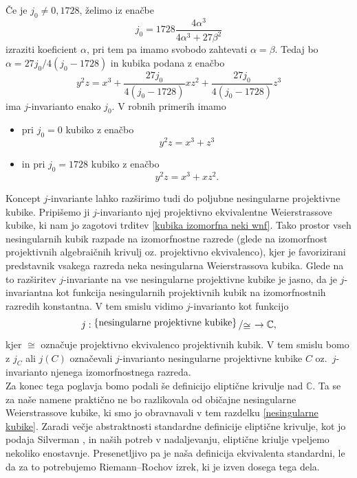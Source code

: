 \documentclass[mat1]{fmfdelo}
\numberwithin{equation}{section}
\newcommand{\C}{\mathbb C}
\newcommand{\bigslant}[2]{{\raisebox{.2em}{$#1$}\left/\raisebox{-.2em}{$#2$}\right.}}
\theoremstyle{definition}
\begin{document}
Če je $j_0 \neq 0, 1728$, želimo iz enačbe
\[
    j_0 = 1728\frac{4\alpha^3}{4\alpha^3 + 27\beta^2}  
\]
izraziti koeficient $\alpha$, pri tem pa imamo svobodo zahtevati $\alpha = \beta$. Tedaj bo $\alpha = 27j_0/4(j_0 - 1728)$ in kubika podana z enačbo 
\[
  y^2z = x^3 + \frac{27j_0}{4(j_0 - 1728)}xz^2 + \frac{27j_0}{4(j_0 - 1728)}z^3
\] 
ima $j$-invarianto enako $j_0$. V robnih primerih imamo

\begin{itemize}
    \item pri $j_0 = 0$ kubiko z enačbo 
    \[
        y^2z = x^3 + z^3
    \]
    \item in pri $j_0 = 1728$ kubiko z enačbo
    \[
        y^2z = x^3 + xz^2.
    \]
\end{itemize}

Koncept $j$-invariante lahko razširimo tudi do poljubne nesingularne projektivne kubike. Pripišemo ji $j$-invarianto njej projektivno ekvivalentne Weierstrassove kubike, ki nam jo zagotovi trditev \ref{kubika izomorfna neki wnf}. Tako prostor vseh nesingularnih kubik razpade na izomorfnostne razrede (glede na izomorfnost projektivnih algebraičnih krivulj oz. projektivno ekvivalenco), kjer je favorizirani predstavnik vsakega razreda neka nesingularna Weierstrassova kubika. Glede na to razširitev $j$-invariante na vse nesingularne projektivne kubike je jasno, da je $j$-invariantna kot funkcija nesingularnih projektivnih kubik na izomorfnostnih razredih konstantna. V tem smislu vidimo $j$-invarianto kot funkcijo
\[
    j: \bigslant{\{\text{nesingularne projektivne kubike}\}}{\cong} \to \C,
\]
kjer $\cong$ označuje projektivno ekvivalenco projektivnih kubik. V tem smislu bomo z $j_C$ ali $j(C)$ označevali $j$-invarianto nesingularne projektivne kubike $C$ oz.\ $j$-invarianto njenega izomorfnostnega razreda.
\\

Za konec tega poglavja bomo podali še definicijo eliptične krivulje nad $\C$. Ta se za naše namene praktično ne bo razlikovala od običajne nesingularne Weierstrassove kubike, ki smo jo obravnavali v tem razdelku \ref{nesingularne kubike}. Zaradi večje abstraktnosti standardne definicije eliptične krivulje, kot jo podaja Silverman \cite[III. \S 3]{Silverman}, in naših potreb v nadaljevanju, eliptične kriulje vpeljemo nekoliko enostavnje. Presenetljivo pa je
naša definicija ekvivalenta standardni, le da za to potrebujemo Riemann--Rochov izrek, ki je izven dosega tega dela.
\end{document}
